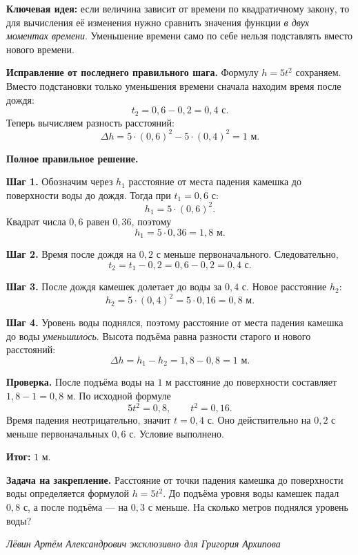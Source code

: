 \documentclass[12pt,a4paper]{article}
\begin{document}
\textcolor{blue!60!black}{\textbf{Ключевая идея:}} если величина зависит от времени по квадратичному закону, то для вычисления её изменения нужно сравнить значения функции \emph{в двух моментах времени}. Уменьшение времени само по себе нельзя подставлять вместо нового времени.

\textbf{Исправление от последнего правильного шага.} Формулу $h=5t^2$ сохраняем. Вместо подстановки только уменьшения времени сначала находим время после дождя:
\[
t_2=0{,}6-0{,}2=0{,}4\text{ с}.
\]
Теперь вычисляем разность расстояний:
\[
\Delta h=5\cdot(0{,}6)^2-5\cdot(0{,}4)^2=1\text{ м}.
\]

\textbf{Полное правильное решение.}

\textbf{Шаг 1.} Обозначим через $h_1$ расстояние от места падения камешка до поверхности воды до дождя. Тогда при $t_1=0{,}6$ с:
\[
h_1=5\cdot(0{,}6)^2.
\]
Квадрат числа $0{,}6$ равен $0{,}36$, поэтому
\[
h_1=5\cdot0{,}36=1{,}8\text{ м}.
\]

\textbf{Шаг 2.} Время после дождя на $0{,}2$ с меньше первоначального. Следовательно,
\[
t_2=t_1-0{,}2=0{,}6-0{,}2=0{,}4\text{ с}.
\]

\textbf{Шаг 3.} После дождя камешек долетает до воды за $0{,}4$ с. Новое расстояние $h_2$:
\[
h_2=5\cdot(0{,}4)^2=5\cdot0{,}16=0{,}8\text{ м}.
\]

\textbf{Шаг 4.} Уровень воды поднялся, поэтому расстояние от места падения камешка до воды \emph{уменьшилось}. Высота подъёма равна разности старого и нового расстояний:
\[
\Delta h=h_1-h_2=1{,}8-0{,}8=1\text{ м}.
\]

\textbf{Проверка.} После подъёма воды на $1$ м расстояние до поверхности составляет $1{,}8-1=0{,}8$ м. По исходной формуле
\[
5t^2=0{,}8,\qquad t^2=0{,}16.
\]
Время падения неотрицательно, значит $t=0{,}4$ с. Оно действительно на $0{,}2$ с меньше первоначальных $0{,}6$ с. Условие выполнено.

\textcolor{teal!60!black}{\textbf{Итог:}} $\boxed{1\text{ м}}$.

\textbf{Задача на закрепление.} Расстояние от точки падения камешка до поверхности воды определяется формулой $h=5t^2$. До подъёма уровня воды камешек падал $0{,}8$ с, а после подъёма --- на $0{,}3$ с меньше. На сколько метров поднялся уровень воды?

\vfill
\begin{center}
\small\itshape Лёвин Артём Александрович эксклюзивно для Григория Архипова
\end{center}
\end{document}
